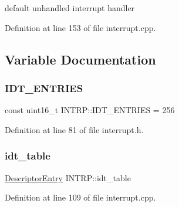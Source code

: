default unhandled interrupt handler 



Definition at line 153 of file interrupt.\+cpp.



\subsection{Variable Documentation}
\mbox{\label{namespace_i_n_t_r_p_a1022b4dc1d9af1ea393f7f038ff421ce}} 
\subsubsection{\texorpdfstring{I\+D\+T\+\_\+\+E\+N\+T\+R\+I\+ES}{IDT\_ENTRIES}}
{\footnotesize\ttfamily const uint16\+\_\+t I\+N\+T\+R\+P\+::\+I\+D\+T\+\_\+\+E\+N\+T\+R\+I\+ES = 256}



Definition at line 81 of file interrupt.\+h.

\mbox{\label{namespace_i_n_t_r_p_a8e4e29dae90a4087ed1ac8cf845218c4}} 
\subsubsection{\texorpdfstring{idt\+\_\+table}{idt\_table}}
{\footnotesize\ttfamily \hyperlink{union_i_n_t_r_p_1_1_descriptor_entry}{Descriptor\+Entry} I\+N\+T\+R\+P\+::idt\+\_\+table}



Definition at line 109 of file interrupt.\+cpp.

